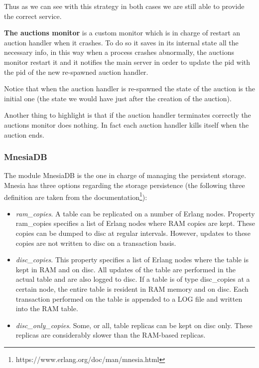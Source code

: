 \noindent Thus as we can see with this strategy in both cases we are still able to provide the correct service.

\vspace{0.5cm}

\textbf{The auctions monitor} is a custom monitor which is in charge of restart an auction handler when it crashes. To do so it saves in its internal state all the necessary info, in this way when a process crashes abnormally, the auctions monitor restart it and it notifies the main server in order to update the pid with the pid of the new re-spawned auction handler.

\noindent Notice that when the auction handler is re-spawned the state of the auction is the initial one (the state we would have just after the creation of the auction).

\noindent Another thing to highlight is that if the auction handler terminates correctly the auctions monitor does nothing. In fact each auction handler kills itself when the auction ends.


\subsubsection{MnesiaDB}
\noindent The module MnesiaDB is the one in charge of managing the persistent storage. Mnesia has three options regarding the storage persistence (the following three definition are taken from the documentation\footnote{https://www.erlang.org/doc/man/mnesia.html}):
\begin{itemize}
	\item \textit{ram\_copies}. A table can be replicated on a number of Erlang nodes. Property ram\_copies specifies a list of Erlang nodes where RAM copies are kept. These copies can be dumped to disc at regular intervals. However, updates to these copies are not written to disc on a transaction basis.
	
	\item \textit{disc\_copies}. This property specifies a list of Erlang nodes where the table is kept in RAM and on disc. All updates of the table are performed in the actual table and are also logged to disc. If a table is of type disc\_copies at a certain node, the entire table is resident in RAM memory and on disc. Each transaction performed on the table is appended to a LOG file and written into the RAM table.
	
	\item \textit{disc\_only\_copies}. Some, or all, table replicas can be kept on disc only. These replicas are considerably slower than the RAM-based replicas.
\end{itemize}

